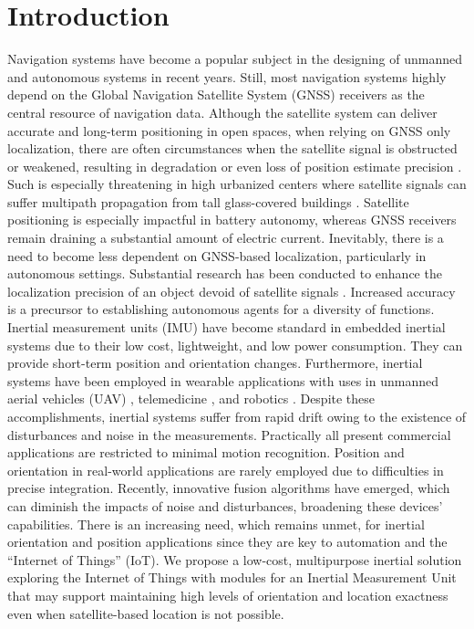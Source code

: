 \section{Introduction}
Navigation systems have become a popular subject in the designing of unmanned and autonomous systems in recent years. Still, most navigation systems highly depend on the Global Navigation Satellite System (GNSS) receivers as the central resource of navigation data. Although the satellite system can deliver accurate and long-term positioning in open spaces, when relying on GNSS only localization, there are often circumstances when the satellite signal is obstructed or weakened, resulting in degradation or even loss of position estimate precision \cite{ioannides2016known}. Such is especially threatening in high urbanized centers where satellite signals can suffer multipath propagation from tall glass-covered buildings \cite{omar2016integration}. Satellite positioning is especially impactful in battery autonomy, whereas GNSS receivers remain draining a substantial amount of electric current. Inevitably, there is a need to become less dependent on GNSS-based localization, particularly in autonomous settings. Substantial research has been conducted to enhance the localization precision of an object devoid of satellite signals \cite{nassar2004improving}\cite{dewhirst2016improving}\cite{kao1991integration}\cite{coyte2013displacement}\cite{wong1988high}. Increased accuracy is a precursor to establishing autonomous agents for a diversity of functions. Inertial measurement units (IMU) have become standard in embedded inertial systems due to their low cost, lightweight, and low power consumption. They can provide short-term position and orientation changes. Furthermore, inertial systems have been employed in wearable applications with uses in unmanned aerial vehicles (UAV) \cite{hetenyi2016sensor}\cite{luo2013uav}\cite{sharma2014sensor}, telemedicine \cite{madgwick2020extended}, and robotics \cite{wilson2019formulation}. Despite these accomplishments, inertial systems suffer from rapid drift owing to the existence of disturbances and noise in the measurements. Practically all present commercial applications are restricted to minimal motion recognition. Position and orientation in real-world applications are rarely employed due to difficulties in precise integration. Recently, innovative fusion algorithms have emerged, which can diminish the impacts of noise and disturbances, broadening these devices’ capabilities. There is an increasing need, which remains unmet, for inertial orientation and position applications since they are key to automation and the “Internet of Things” (IoT).
We propose a low-cost, multipurpose inertial solution exploring the Internet of Things with modules for an Inertial Measurement Unit that may support maintaining high levels of orientation and location exactness even when satellite-based location is not possible.

